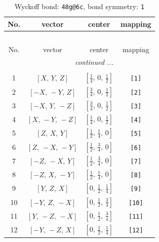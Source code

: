 \documentclass[fleqn,8pt]{jsarticle}
\begin{document}
\begin{longtable}{cccc}
\caption{Wyckoff bond: {\tt 48g@6c}, bond symmetry: {\tt 1}}
 \\
 \hline \hline
No. & vector & center & mapping \\ \hline \endfirsthead

\multicolumn{3}{l}{\tablename\ \thetable{}} \\
 \hline \hline
No. & vector & center & mapping \\ \hline \endhead

 \hline \hline
\multicolumn{3}{r}{\footnotesize\it continued ...} \\ \endfoot

 \hline \hline
\multicolumn{3}{r}{} \\ \endlastfoot

1 & $\left[ X,\, Y,\, Z \right]$ & $\left[ \frac{1}{4},\, 0,\, \frac{1}{2} \right]$ & {\tt [1]} \\ \hline
2 & $\left[ - X,\, - Y,\, Z \right]$ & $\left[ \frac{3}{4},\, 0,\, \frac{1}{2} \right]$ & {\tt [2]} \\ \hline
3 & $\left[ - X,\, Y,\, - Z \right]$ & $\left[ \frac{3}{4},\, 0,\, \frac{1}{2} \right]$ & {\tt [3]} \\ \hline
4 & $\left[ X,\, - Y,\, - Z \right]$ & $\left[ \frac{1}{4},\, 0,\, \frac{1}{2} \right]$ & {\tt [4]} \\ \hline
5 & $\left[ Z,\, X,\, Y \right]$ & $\left[ \frac{1}{2},\, \frac{1}{4},\, 0 \right]$ & {\tt [5]} \\ \hline
6 & $\left[ Z,\, - X,\, - Y \right]$ & $\left[ \frac{1}{2},\, \frac{3}{4},\, 0 \right]$ & {\tt [6]} \\ \hline
7 & $\left[ - Z,\, - X,\, Y \right]$ & $\left[ \frac{1}{2},\, \frac{3}{4},\, 0 \right]$ & {\tt [7]} \\ \hline
8 & $\left[ - Z,\, X,\, - Y \right]$ & $\left[ \frac{1}{2},\, \frac{1}{4},\, 0 \right]$ & {\tt [8]} \\ \hline
9 & $\left[ Y,\, Z,\, X \right]$ & $\left[ 0,\, \frac{1}{2},\, \frac{1}{4} \right]$ & {\tt [9]} \\ \hline
10 & $\left[ - Y,\, Z,\, - X \right]$ & $\left[ 0,\, \frac{1}{2},\, \frac{3}{4} \right]$ & {\tt [10]} \\ \hline
11 & $\left[ Y,\, - Z,\, - X \right]$ & $\left[ 0,\, \frac{1}{2},\, \frac{3}{4} \right]$ & {\tt [11]} \\ \hline
12 & $\left[ - Y,\, - Z,\, X \right]$ & $\left[ 0,\, \frac{1}{2},\, \frac{1}{4} \right]$ & {\tt [12]} \\ \hline

\end{longtable}
\end{document}
